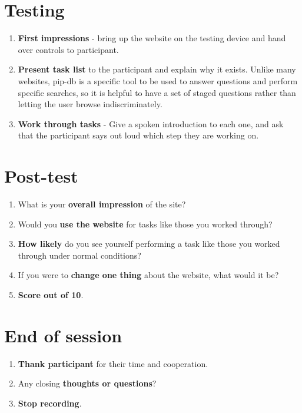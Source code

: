 \section*{Testing}
\begin{enumerate}
\item \textbf{First impressions} - bring up the website on the testing
  device and hand over controls to participant.
\item \textbf{Present task list} to the participant and explain why it
  exists. Unlike many websites, pip-db is a specific tool to be used
  to answer questions and perform specific searches, so it is helpful
  to have a set of staged questions rather than letting the user
  browse indiscriminately.
\item \textbf{Work through tasks} - Give a spoken introduction to each
  one, and ask that the participant says out loud which step they are
  working on.
\end{enumerate}

\section*{Post-test}
\begin{enumerate}
\item What is your \textbf{overall impression} of the site?
\item Would you \textbf{use the website} for tasks like those you
  worked through?
\item \textbf{How likely} do you see yourself performing a task like
  those you worked through under normal conditions?
\item If you were to \textbf{change one thing} about the website, what
  would it be?
\item \textbf{Score out of 10}.
\end{enumerate}

\section*{End of session}
\begin{enumerate}
\item \textbf{Thank participant} for their time and cooperation.
\item Any closing \textbf{thoughts or questions}?
\item \textbf{Stop recording}.
\end{enumerate}